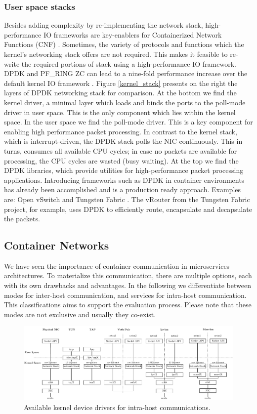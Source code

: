 \documentclass[conference]{IEEEtran}
\begin{document}
\subsubsection{User space stacks}
Besides adding complexity by re-implementing the network stack, high-performance IO frameworks are key-enablers for Containerized Network Functions (CNF) \cite{SIGARCH_2017:Yang}. Sometimes, the variety of protocols and functions which the kernel's networking stack offers are not required. This makes it feasible to re-write the required portions of stack using a high-performance IO framework. DPDK \cite{dpdk} and PF\_RING ZC \cite{pf_ring_zc} can lead to a nine-fold performance increase over the default kernel IO framework \cite{ANCS:Gallenmuller}. Figure \ref{kernel_stack} presents on the right the layers of DPDK networking stack for comparison. At the bottom we find the kernel driver, a minimal layer which loads and binds the ports to the poll-mode driver in user space. This is the only component which lies within the kernel space. In the user space we find the poll-mode driver. This is a key component for enabling high performance packet processing. In contrast to the kernel stack, which is interrupt-driven, the DPDK stack polls the NIC continuously. This in turns, consumes all available CPU cycles; in case no packets are available for processing, the CPU cycles are wasted (busy waiting). At the top we find the DPDK libraries, which provide utilities for high-performance packet processing applications. Introducing frameworks such as DPDK in container environments has already been accomplished and is a production ready approach. Examples are: Open vSwitch \cite{ovs-dpdk} and Tungsten Fabric \cite{tungsten-dpdk}. The vRouter from the Tungsten Fabric project, for example, uses DPDK to efficiently route, encapsulate and decapsulate the packets.
\subsection{Container Networks}
We have seen the importance of container communication in microservices architectures. To materialize this communication, there are multiple options, each with its own drawbacks and advantages. In the following we differentiate between modes for inter-host communication, and services for intra-host communication. This classifications aims to support the evaluation process. Please note that these modes are not exclusive and usually they co-exist.

\begin{figure}[!t]
\centering
\includegraphics[width=\textwidth]{container_network.drawio.pdf}
\caption{Available kernel device drivers for intra-host communications.}
\label{virtual_networks}
\end{figure}
\end{document}
